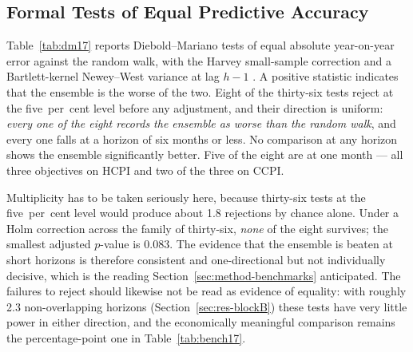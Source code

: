 \documentclass[12pt]{article}
\begin{document}
\subsection{Formal Tests of Equal Predictive Accuracy}
\label{sec:res-dm}

Table~\ref{tab:dm17} reports Diebold--Mariano tests of equal absolute
year-on-year error against the random walk, with the Harvey small-sample
correction and a Bartlett-kernel Newey--West variance at lag $h-1$
\citep{diebold1995,harvey1997,neweywest1987}. A positive statistic indicates
that the ensemble is the worse of the two. Eight of the thirty-six tests reject
at the five~per~cent level before any adjustment, and their direction is
uniform: \emph{every one of the eight records the ensemble as worse than the
random walk}, and every one falls at a horizon of six months or less. No
comparison at any horizon shows the ensemble significantly better. Five of the
eight are at one month --- all three objectives on HCPI and two of the three on
CCPI.

Multiplicity has to be taken seriously here, because thirty-six tests at the
five~per~cent level would produce about 1.8 rejections by chance alone. Under a
Holm correction across the family of thirty-six, \emph{none} of the eight
survives; the smallest adjusted $p$-value is $0.083$. The evidence that the
ensemble is beaten at short horizons is therefore consistent and one-directional
but not individually decisive, which is the reading
Section~\ref{sec:method-benchmarks} anticipated. The failures to reject should
likewise not be read as evidence of equality: with roughly 2.3 non-overlapping
horizons (Section~\ref{sec:res-blockB}) these tests have very little power in
either direction, and the economically meaningful comparison remains the
percentage-point one in Table~\ref{tab:bench17}.
\end{document}
